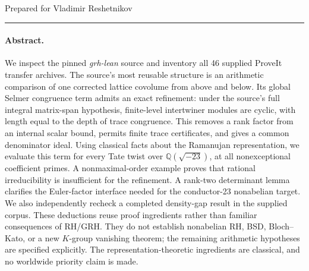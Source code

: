 \documentclass[11pt,letterpaper]{article}
\theoremstyle{remark}
\newcommand{\Q}{\mathbb Q}
\begin{document}
\thispagestyle{plain}
\par
\vspace{0.35cm}
\par
\vspace{0.1cm}
\par
\vspace{0.25cm}
\par
\vspace{0.2cm}
\noindent Prepared for Vladimir Reshetnikov\par
\noindent\rule{\linewidth}{0.5pt}

\paragraph{Abstract.}
We inspect the pinned \emph{grh-lean} source and inventory all 46 supplied
ProveIt transfer archives. The source's most reusable structure is an
arithmetic comparison of one corrected lattice covolume from above and
below. Its global Selmer congruence term admits an exact refinement:
under the source's full integral matrix-span hypothesis, finite-level
intertwiner modules are cyclic, with length equal to the depth of trace
congruence. This removes a rank factor from an internal scalar bound,
permits finite trace certificates, and gives a common denominator ideal.
Using classical facts about the Ramanujan representation, we evaluate
this term for every Tate twist over \(\Q(\sqrt{-23})\), at all
nonexceptional coefficient primes. A nonmaximal-order example proves
that rational irreducibility is insufficient for the refinement.
A rank-two determinant lemma clarifies the Euler-factor interface needed
for the conductor-23 nonabelian target. We also independently recheck a
completed density-gap result in the supplied corpus. These deductions
reuse proof ingredients rather than familiar consequences of RH/GRH.
They do not establish nonabelian RH, BSD, Bloch--Kato, or a new
\(K\)-group vanishing theorem; the remaining arithmetic hypotheses are
specified explicitly. The representation-theoretic ingredients are
classical, and no worldwide priority claim is made.

\begingroup
\small
\setlength{\parskip}{0pt}
\tableofcontents
\endgroup
\newpage










\appendix


\clearpage

\end{document}
